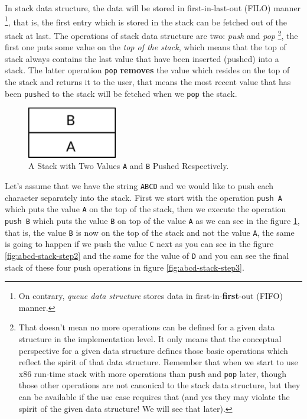 In stack data structure, the data will be stored in first-in-last-out
(FILO) manner \footnote{On contrary, \emph{queue data structure} stores
  data in first-in-\textbf{first}-out (FIFO) manner.}, that is, the
first entry which is stored in the stack can be fetched out of the stack
at last. The operations of stack data structure are two: \emph{push} and
\emph{pop} \footnote{That doesn't mean no more operations can be defined
  for a given data structure in the implementation level. It only means
  that the conceptual perspective for a given data structure defines
  those basic operations which reflect the spirit of that data
  structure. Remember that when we start to use x86 run-time stack with
  more operations than \lstinline!push! and \lstinline!pop! later,
  though those other operations are not canonical to the stack data
  structure, but they can be available if the use case requires that
  (and yes they may violate the spirit of the given data structure! We
  will see that later).}, the first one puts some value on the \emph{top
of the stack}, which means that the top of stack always contains the
last value that have been inserted (pushed) into a stack. The latter
operation \lstinline!pop! \textbf{removes} the value which resides on
the top of the stack and returns it to the user, that means the most
recent value that has been \lstinline!push!ed to the stack will be
fetched when we \lstinline!pop! the stack.

\begin{figure}
\centering
\includegraphics[width=0.35000\textwidth]{Figures/x86-ch/abcd-stack-step1.png}
\caption{A Stack with Two Values \lstinline!A! and \lstinline!B! Pushed
Respectively.}\label{fig:abcd-stack-step1}
\end{figure}

Let's assume that we have the string \lstinline!ABCD! and we would like
to push each character separately into the stack. First we start with
the operation \lstinline!push A! which puts the value \lstinline!A! on
the top of the stack, then we execute the operation \lstinline!push B!
which puts the value \lstinline!B! on top of the value \lstinline!A! as
we can see in the figure \ref{fig:abcd-stack-step1}, that is, the value
\lstinline!B! is now on the top of the stack and not the value
\lstinline!A!, the same is going to happen if we push the value
\lstinline!C! next as you can see in the figure
\ref{fig:abcd-stack-step2} and the same for the value of \lstinline!D!
and you can see the final stack of these four push operations in figure
\ref{fig:abcd-stack-step3}.

